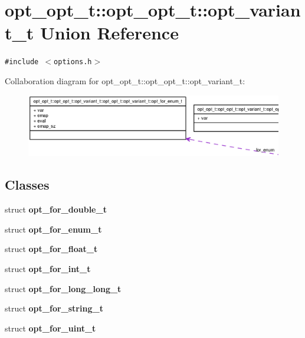 \section{opt\_\-opt\_\-t::opt\_\-opt\_\-t::opt\_\-variant\_\-t Union Reference}
\label{unionopt__opt__t_1_1opt__variant__t}
{\tt \#include $<$options.h$>$}

Collaboration diagram for opt\_\-opt\_\-t::opt\_\-opt\_\-t::opt\_\-variant\_\-t:\nopagebreak
\begin{figure}[H]
\begin{center}
\leavevmode
\includegraphics[width=400pt]{unionopt__opt__t_1_1opt__variant__t__coll__graph}
\end{center}
\end{figure}
\subsection*{Classes}
\begin{CompactItemize}
\item 
struct {\bf opt\_\-for\_\-double\_\-t}
\item 
struct {\bf opt\_\-for\_\-enum\_\-t}
\item 
struct {\bf opt\_\-for\_\-float\_\-t}
\item 
struct {\bf opt\_\-for\_\-int\_\-t}
\item 
struct {\bf opt\_\-for\_\-long\_\-long\_\-t}
\item 
struct {\bf opt\_\-for\_\-string\_\-t}
\item 
struct {\bf opt\_\-for\_\-uint\_\-t}
\end{CompactItemize}
